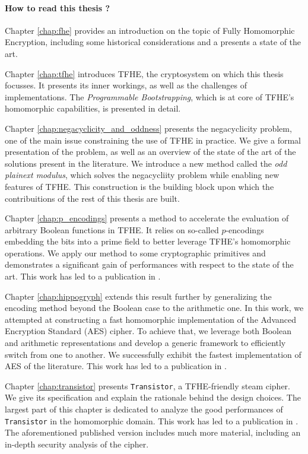 
\paragraph{How to read this thesis ?}


Chapter \ref{chap:fhe} provides an introduction on the topic of Fully Homomorphic Encryption, including some historical considerations and a presents a state of the art.

Chapter \ref{chap:tfhe} introduces TFHE, the cryptosystem on which this thesis focusses. It presents its inner workings, as well as the challenges of implementations. The \textit{Programmable Bootstrapping}, which is at core of TFHE's homomorphic capabilities, is presented in detail.

Chapter \ref{chap:negacyclicity_and_oddness} presents the negacyclicity problem, one of the main issue constraining the use of TFHE in practice. We give a formal presentation of the problem, as well as an overview of the state of the art of the solutions present in the literature. We introduce a new method called the \textit{odd plainext modulus}, which solves the negacycliity problem while enabling new features of TFHE. This construction is the building block upon which the contribuitions of the rest of this thesis are built.

Chapter \ref{chap:p_encodings} presents a method to accelerate the evaluation of arbitrary Boolean functions in TFHE. It relies on so-called $p$-encodings embedding the bits into a prime field to better leverage TFHE's homomorphic operations. We apply our method to some cryptographic primitives and demonstrates a significant gain of performances with respect to the state of the art. 
This work has led to a publication in 
.


Chapter \ref{chap:hippogryph} extends this result further by generalizing the encoding method beyond the Boolean case to the arithmetic one. In this work, we attempted at constructing a fast homomorphic implementation of the Advanced Encryption Standard (AES) cipher. To achieve that, we leverage both Boolean and arithmetic representations and develop a generic framework to efficiently switch from one to another. We successfully exhibit the fastest implementation of AES of the literature.
This work has led to a publication in 
.


Chapter \ref{chap:transistor} presents \texttt{Transistor}, a TFHE-friendly steam cipher. We give its specification and explain the rationale behind the design choices. The largest part of this chapter is dedicated to analyze the good performances of \texttt{Transistor} in the homomorphic domain. 
This work has led to a publication in 
.
The aforementioned published version includes much more material, including an in-depth security analysis of the cipher.


